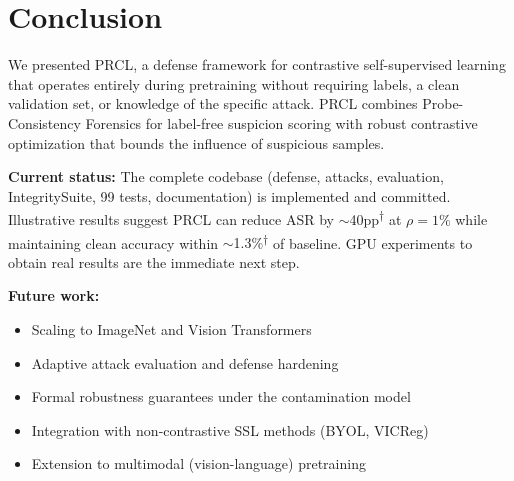 \documentclass[11pt,a4paper]{article}
\newcommand{\madeupresult}[1]{\textcolor{madeup}{#1\textsuperscript{$\dagger$}}}
\begin{document}
\section{Conclusion}
\label{sec:conclusion}

We presented PRCL, a defense framework for contrastive self-supervised learning
that operates entirely during pretraining without requiring labels, a clean
validation set, or knowledge of the specific attack.  PRCL combines
Probe-Consistency Forensics for label-free suspicion scoring with robust
contrastive optimization that bounds the influence of suspicious samples.

\textbf{Current status:} The complete codebase (defense, attacks, evaluation,
IntegritySuite, 99 tests, documentation) is implemented and committed.
Illustrative results suggest PRCL can reduce ASR by
\madeupresult{$\sim$40pp} at $\rho=1\%$ while maintaining clean accuracy
within \madeupresult{$\sim$1.3\%} of baseline.  GPU experiments to obtain real
results are the immediate next step.

\textbf{Future work:}
\begin{itemize}[nosep]
  \item Scaling to ImageNet and Vision Transformers
  \item Adaptive attack evaluation and defense hardening
  \item Formal robustness guarantees under the contamination model
  \item Integration with non-contrastive SSL methods (BYOL, VICReg)
  \item Extension to multimodal (vision-language) pretraining
\end{itemize}
\end{document}
